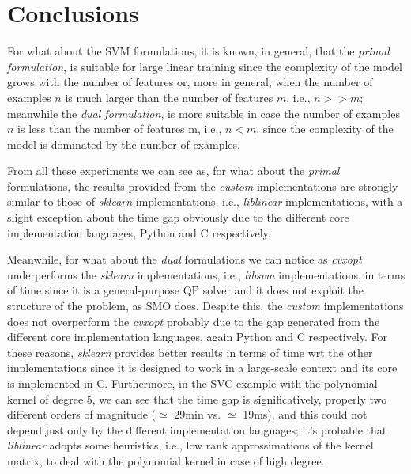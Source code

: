 \section{Conclusions}

For what about the SVM formulations, it is known, in general, that the \emph{primal formulation}, is suitable for large linear training since the complexity of the model grows with the number of features or, more in general, when the number of examples $n$ is much larger than the number of features $m$, i.e., $n >> m$; meanwhile the \emph{dual formulation}, is more suitable in case the number of examples $n$ is less than the number of features m, i.e., $n < m$, since the complexity of the model is dominated by the number of examples.

\bigskip

From all these experiments we can see as, for what about the \emph{primal} formulations, the results provided from the \emph{custom} implementations are strongly similar to those of \emph{sklearn} implementations, i.e., \emph{liblinear} \cite{fan2008liblinear} implementations, with a slight exception about the time gap obviously due to the different core implementation languages, Python and C respectively.

Meanwhile, for what about the \emph{dual} formulations we can notice as \emph{cvxopt} \cite{vandenberghe2010cvxopt} underperforms the \emph{sklearn} implementations, i.e., \emph{libsvm} \cite{chang2011libsvm} implementations, in terms of time since it is a general-purpose QP solver and it does not exploit the structure of the problem, as SMO does.
Despite this, the \emph{custom} implementations does not overperform the \emph{cvxopt} \cite{vandenberghe2010cvxopt} probably due to the gap generated from the different core implementation languages, again Python and C respectively.
For these reasons, \emph{sklearn} provides better results in terms of time wrt the other implementations since it is designed to work in a large-scale context and its core is implemented in C.
Furthermore, in the SVC example with the polynomial kernel of degree 5, we can see that the time gap is significatively, properly two different orders of magnitude ($\simeq$ 29min vs. $\simeq$ 19ms), and this could not depend just only by the different implementation languages; it's probable that \emph{liblinear} \cite{fan2008liblinear} adopts some heuristics, i.e., low rank approssimations of the kernel matrix, to deal with the polynomial kernel in case of high degree.

